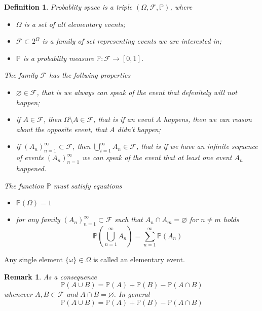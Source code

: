 \documentclass[12pt]{article}
\newtheorem{remark}[theorem]{Remark}
\newtheorem{definition}[theorem]{Definition}
\begin{document}
\begin{definition}
    Probablity space is a triple $(\Omega,\mathcal{F}, \mathbb{P})$, where

    \begin{itemize}
        \item $\Omega$ is a set of all elementary events;
        \item $\mathcal{F}\subset 2^\Omega$ is a family of set representing events 
              we are interested in;
        \item $\mathbb{P}$ is a probablity measure 
              $\mathbb{P}:\mathcal{F}\to [0,1]$.
    \end{itemize}
    The family $\mathcal{F}$ has the follwing properties
    \begin{itemize}
        \item $\varnothing\in\mathcal{F}$, that is we always can speak of the 
              event that defenitely will not happen; 
        \item if $A\in\mathcal{F}$, then $\Omega\setminus A\in\mathcal{F}$, that
              is if an event $A$ happens, then we can reason about the opposite
              event, that $A$ didn't happen;
        \item if ${(A_n)}_{n=1}^\infty\subset\mathcal{F}$, then 
              $\bigcup_{i=1}^\infty A_n\in\mathcal{F}$, that is if we have an 
              infinite sequence of events ${(A_n)}_{n=1}^\infty$ we can speak of 
              the event that at least one event $A_n$ happened.   
    \end{itemize}

    The function $\mathbb{P}$ must satisfy equations
    \begin{itemize}
        \item $\mathbb{P}(\Omega)=1$
        \item for any family ${(A_n)}_{n=1}^\infty\subset\mathcal{F}$ such that 
              $A_n\cap A_m=\varnothing$ for $n\neq m$ holds
              $$
              \mathbb{P}\left(\bigcup_{n=1}^\infty A_n\right)
              =\sum_{n=1}^\infty \mathbb{P}(A_n)
              $$
    \end{itemize}
\end{definition}

Any single element $\{\omega \} \in\Omega$ is called an elementary event.

\begin{remark} As a consequence 
    $$
        \mathbb{P}(A\cup B)=\mathbb{P}(A)+\mathbb{P}(B)-\mathbb{P}(A\cap B)
    $$
    whenever $A,B\in\mathcal{F}$ and $A\cap B=\varnothing$. In general
    $$
        \mathbb{P}(A\cup B)=\mathbb{P}(A)+\mathbb{P}(B)-\mathbb{P}(A\cap B)
    $$
\end{remark}
\end{document}
